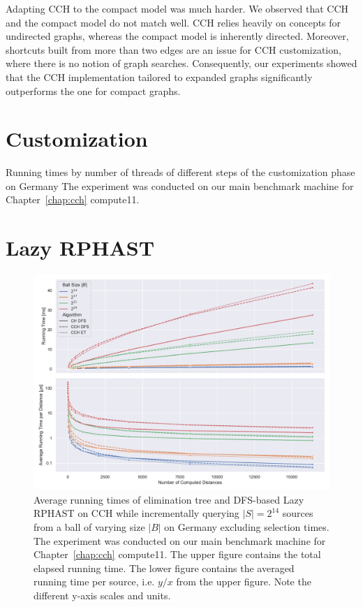 \documentclass[a4paper, english, cleveref]{lipics-v2021}
\begin{document}
Adapting CCH to the compact model was much harder. We observed that CCH and the compact model do not match well. CCH relies heavily on concepts for undirected graphs, whereas the compact model is inherently directed. Moreover, shortcuts built from more than two edges are an issue for CCH customization, where there is no notion of graph searches. Consequently, our experiments showed that the CCH implementation tailored to expanded graphs significantly outperforms the one for compact graphs.



\appendix
\section{Customization}

\begin{table}
\centering
\caption{
Running times by number of threads of different steps of the customization phase on Germany
The experiment was conducted on our main benchmark machine for Chapter~\ref{chap:cch} compute11.
}\label{tab:customization_ger}

\end{table}

\section{Lazy RPHAST}

\begin{figure}
\centering
\includegraphics[width=\linewidth]{fig/lazy_rphast_et_vs_dfs_ger.pdf}
\caption{
Average running times of elimination tree and DFS-based Lazy RPHAST on CCH while incrementally querying $|S| = 2^{14}$ sources from a ball of varying size $|B|$ on Germany excluding selection times.
The experiment was conducted on our main benchmark machine for Chapter~\ref{chap:cch} compute11.
The upper figure contains the total elapsed running time.
The lower figure contains the averaged running time per source, i.e. $y/x$ from the upper figure.
Note the different y-axis scales and units.
}\label{fig:et_vs_dfs_ger}
\end{figure}
\end{document}
